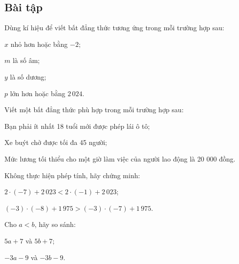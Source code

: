 \begin{exercises}
    \subsection{Bài tập}

    \begin{questions}[resume=SGK]
        \item Dùng kí hiệu để viết bất đẳng thức tương ứng trong mỗi trường hợp sau:
        \begin{questions}
            \item $x$ nhỏ hơn hoặc bằng $-2$;
            \item $m$ là số âm;
            \item $y$ là số dương;
            \item $p$ lớn hơn hoặc bằng $2\,024$.
        \end{questions}
        \answerline

        \item Viết một bất đẳng thức phù hợp trong mỗi trường hợp sau:
        \begin{questions}
            \item Bạn phải ít nhất 18 tuổi mới được phép lái ô tô;
            \item Xe buýt chở được tối đa 45 người;
            \item Mức lương tối thiểu cho một giờ làm việc của người lao động là 20 000 đồng.
        \end{questions}
        \answerline

        \item Không thực hiện phép tính, hãy chứng minh:
        \begin{questions}
            \item $2\cdot(-7)+2\,023<2\cdot(-1)+2\,023$;

            \answerline
            \item $(-3)\cdot(-8)+1\,975>(-3)\cdot(-7)+1\,975$.

            \answerline
        \end{questions}

        \item Cho $a<b$, hãy so sánh:
        \begin{questions}
            \item $5a+7$ và $5b+7$;

            \answerline
            \item $-3a-9$ và $-3b-9$.


\end{questions}
\end{questions}
\end{exercises}
